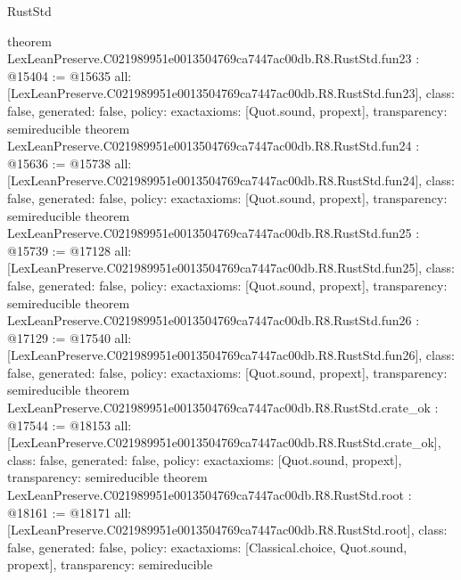 \begin{lexlean}{RustStd}
\begin{coremodule}
{}
theorem LexLeanPreserve.C021989951e0013504769ca7447ac00db.R8.RustStd.fun23 : @15404 := @15635 {
  all: [LexLeanPreserve.C021989951e0013504769ca7447ac00db.R8.RustStd.fun23],
  class: false,
  generated: false,
  policy: exact{axioms: [Quot.sound, propext]},
  transparency: semireducible
}
theorem LexLeanPreserve.C021989951e0013504769ca7447ac00db.R8.RustStd.fun24 : @15636 := @15738 {
  all: [LexLeanPreserve.C021989951e0013504769ca7447ac00db.R8.RustStd.fun24],
  class: false,
  generated: false,
  policy: exact{axioms: [Quot.sound, propext]},
  transparency: semireducible
}
theorem LexLeanPreserve.C021989951e0013504769ca7447ac00db.R8.RustStd.fun25 : @15739 := @17128 {
  all: [LexLeanPreserve.C021989951e0013504769ca7447ac00db.R8.RustStd.fun25],
  class: false,
  generated: false,
  policy: exact{axioms: [Quot.sound, propext]},
  transparency: semireducible
}
theorem LexLeanPreserve.C021989951e0013504769ca7447ac00db.R8.RustStd.fun26 : @17129 := @17540 {
  all: [LexLeanPreserve.C021989951e0013504769ca7447ac00db.R8.RustStd.fun26],
  class: false,
  generated: false,
  policy: exact{axioms: [Quot.sound, propext]},
  transparency: semireducible
}
theorem LexLeanPreserve.C021989951e0013504769ca7447ac00db.R8.RustStd.crate_ok : @17544 := @18153 {
  all: [LexLeanPreserve.C021989951e0013504769ca7447ac00db.R8.RustStd.crate_ok],
  class: false,
  generated: false,
  policy: exact{axioms: [Quot.sound, propext]},
  transparency: semireducible
}
theorem LexLeanPreserve.C021989951e0013504769ca7447ac00db.R8.RustStd.root : @18161 := @18171 {
  all: [LexLeanPreserve.C021989951e0013504769ca7447ac00db.R8.RustStd.root],
  class: false,
  generated: false,
  policy: exact{axioms: [Classical.choice, Quot.sound, propext]},
  transparency: semireducible
}


\end{coremodule}
\end{lexlean}
